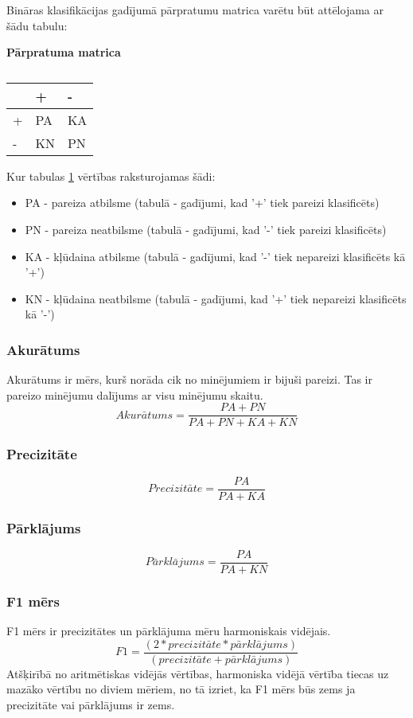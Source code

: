 Bināras klasifikācijas gadījumā pārpratumu matrica varētu būt attēlojama ar šādu tabulu:
\begin{table}[H]
\centering
\caption{\label{tab:novertejums}}
\textbf{Pārpratuma matrica\\}
\begin{tabular}{|l|l|l|}
\hline
  & +  & -  \\ \hline
+ & PA & KA \\ \hline
- & KN & PN \\ \hline
\end{tabular}
\end{table}

Kur tabulas  \ref{tab:novertejums} vērtības raksturojamas šādi:
\begin{itemize}
\item PA - pareiza atbilsme (tabulā - gadījumi, kad '+' tiek pareizi klasificēts)
\item PN - pareiza neatbilsme (tabulā - gadījumi, kad '-' tiek pareizi klasificēts)
\item KA - kļūdaina atbilsme (tabulā - gadījumi, kad '-' tiek nepareizi klasificēts kā '+')
\item KN - kļūdaina neatbilsme (tabulā - gadījumi, kad '+' tiek nepareizi klasificēts kā '-')

\end{itemize}
\subsubsection{Akurātums}
Akurātums ir mērs, kurš norāda cik no minējumiem ir bijuši pareizi. Tas ir pareizo minējumu dalījums ar visu minējumu skaitu.
\begin{equation}
Akur\bar{a}tums = \frac{PA + PN}{PA + PN + KA + KN}
\end{equation}
\subsubsection{Precizitāte}
\begin{equation}
Precizit\bar{a}te = \frac{PA}{PA + KA}
\end{equation}
\subsubsection{Pārklājums}
\begin{equation}
P\bar{a}rkl\bar{a}jums = \frac{PA}{PA + KN}
\end{equation}
\subsubsection{F1 mērs}
F1 mērs ir precizitātes un pārklājuma mēru harmoniskais vidējais.
\begin{equation}
F1 = \frac{(2 * precizit\bar{a}te * p\bar{a}rkl\bar{a}jums)}{(precizit\bar{a}te + p\bar{a}rkl\bar{a}jums)}
\end{equation}
Atšķirībā no aritmētiskas vidējās vērtības, harmoniska vidējā vērtība tiecas uz mazāko vērtību no diviem mēriem, no tā izriet, ka F1 mērs būs zems ja precizitāte vai pārklājums ir zems.

